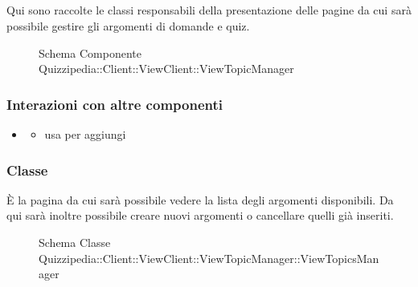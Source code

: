\subsection{}
Qui sono raccolte le classi responsabili della presentazione delle pagine da cui sarà possibile gestire gli argomenti di domande e quiz.
\begin{figure}[H]
\centering
\noindent{}
\caption[Schema Componente Quizzipedia::Client::ViewClient::ViewTopicManager]{Schema Componente Quizzipedia::Client::ViewClient::ViewTopicManager}
\end{figure}
\subsubsection{Interazioni con altre componenti}
\begin{itemize}
\item {}
\begin{itemize}
\item usa  per aggiungi
\end{itemize}
\end{itemize}
\subsubsection{Classe }
È la pagina da cui sarà possibile vedere la lista degli argomenti disponibili. Da qui sarà inoltre possibile creare nuovi argomenti o cancellare quelli già inseriti.
\begin{figure}[H]
\centering
\noindent{}
\caption[Schema Classe ViewTopicsManager]{Schema Classe Quizzipedia::Client::ViewClient::ViewTopicManager::ViewTopicsManager}
\end{figure}
